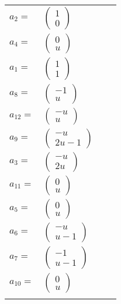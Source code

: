 \documentclass[1p]{elsarticle_modified}
\theoremstyle{definition}
\begin{document}
\begin{tabular}{m{7pt} m{180pt} m{7pt} m{180pt} }
\flushright $a_{2}=$&$\begin{pmatrix}1\\0\end{pmatrix}$ \\
\flushright $a_{4}=$&$\begin{pmatrix}0\\u\end{pmatrix}$ \\
\flushright $a_{1}=$&$\begin{pmatrix}1\\1\end{pmatrix}$ \\
\flushright $a_{8}=$&$\begin{pmatrix}-1\\u\end{pmatrix}$ \\
\flushright $a_{12}=$&$\begin{pmatrix}- u\\u\end{pmatrix}$ \\
\flushright $a_{9}=$&$\begin{pmatrix}- u\\2 u-1\end{pmatrix}$ \\
\flushright $a_{3}=$&$\begin{pmatrix}- u\\2 u\end{pmatrix}$ \\
\flushright $a_{11}=$&$\begin{pmatrix}0\\u\end{pmatrix}$ \\
\flushright $a_{5}=$&$\begin{pmatrix}0\\u\end{pmatrix}$ \\
\flushright $a_{6}=$&$\begin{pmatrix}- u\\u-1\end{pmatrix}$ \\
\flushright $a_{7}=$&$\begin{pmatrix}-1\\u-1\end{pmatrix}$ \\
\flushright $a_{10}=$&$\begin{pmatrix}0\\u\end{pmatrix}$\\&\end{tabular}
\end{document}
